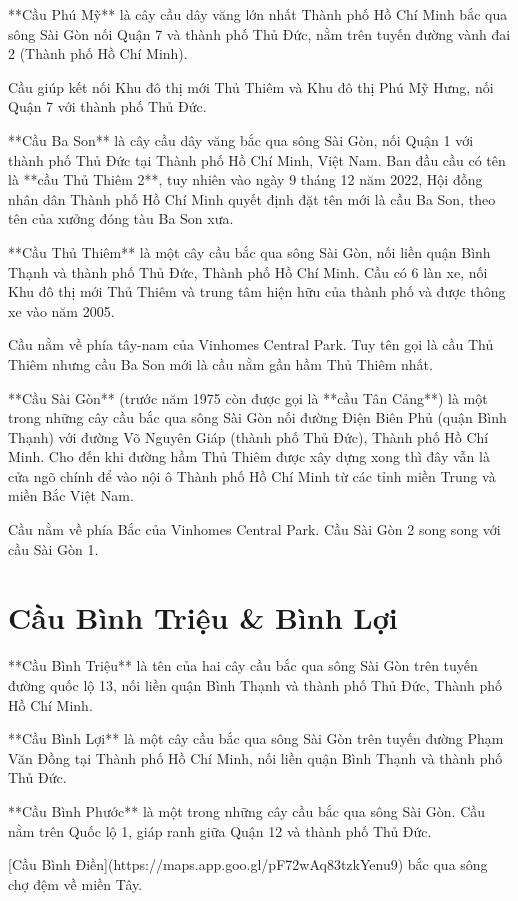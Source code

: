 **Cầu Phú Mỹ** là cây cầu dây văng lớn nhất Thành phố Hồ Chí Minh bắc qua sông Sài Gòn nối Quận 7 và thành phố Thủ Đức, nằm trên tuyến đường vành đai 2 (Thành phố Hồ Chí Minh).

Cầu giúp kết nối Khu đô thị mới Thủ Thiêm và Khu đô thị Phú Mỹ Hưng, nối Quận 7 với thành phố Thủ Đức.

**Cầu Ba Son** là cây cầu dây văng bắc qua sông Sài Gòn, nối Quận 1 với thành phố Thủ Đức tại Thành phố Hồ Chí Minh, Việt Nam. Ban đầu cầu có tên là **cầu Thủ Thiêm 2**, tuy nhiên vào ngày 9 tháng 12 năm 2022, Hội đồng nhân dân Thành phố Hồ Chí Minh quyết định đặt tên mới là cầu Ba Son, theo tên của xưởng đóng tàu Ba Son xưa.

**Cầu Thủ Thiêm** là một cây cầu bắc qua sông Sài Gòn, nối liền quận Bình Thạnh và thành phố Thủ Đức, Thành phố Hồ Chí Minh. Cầu có 6 làn xe, nối Khu đô thị mới Thủ Thiêm và trung tâm hiện hữu của thành phố và được thông xe vào năm 2005.

Cầu nằm về phía tây-nam của Vinhomes Central Park. Tuy tên gọi là cầu Thủ Thiêm nhưng cầu Ba Son mới là cầu nằm gần hầm Thủ Thiêm nhất.

**Cầu Sài Gòn** (trước năm 1975 còn được gọi là **cầu Tân Cảng**) là một trong những cây cầu bắc qua sông Sài Gòn nối đường Điện Biên Phủ (quận Bình Thạnh) với đường Võ Nguyên Giáp (thành phố Thủ Đức), Thành phố Hồ Chí Minh. Cho đến khi đường hầm Thủ Thiêm được xây dựng xong thì đây vẫn là cửa ngõ chính để vào nội ô Thành phố Hồ Chí Minh từ các tỉnh miền Trung và miền Bắc Việt Nam.

Cầu nằm về phía Bắc của Vinhomes Central Park. Cầu Sài Gòn 2 song song với cầu Sài Gòn 1.

\section{Cầu Bình Triệu \& Bình Lợi}

**Cầu Bình Triệu** là tên của hai cây cầu bắc qua sông Sài Gòn trên tuyến đường quốc lộ 13, nối liền quận Bình Thạnh và thành phố Thủ Đức, Thành phố Hồ Chí Minh.

**Cầu Bình Lợi** là một cây cầu bắc qua sông Sài Gòn trên tuyến đường Phạm Văn Đồng tại Thành phố Hồ Chí Minh, nối liền quận Bình Thạnh và thành phố Thủ Đức.

**Cầu Bình Phước** là một trong những cây cầu bắc qua sông Sài Gòn. Cầu nằm trên Quốc lộ 1, giáp ranh giữa Quận 12 và thành phố Thủ Đức.

[Cầu Bình Điền](https://maps.app.goo.gl/pF72wAq83tzkYenu9) bắc qua sông chợ đệm về miền Tây.


